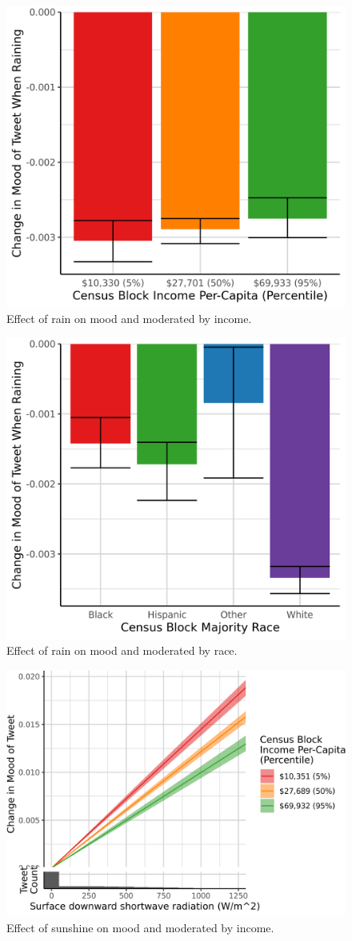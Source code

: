 \documentclass{article}
\begin{document}
\begin{figure}[H]
  \centering
  \includegraphics[width=0.6\linewidth]{../res/raining-income.png}
  \caption{Effect of rain on mood and moderated by income.}
  \label{fig:timeseries}
\end{figure}

\begin{figure}[H]
  \centering
  \includegraphics[width=0.6\linewidth]{../res/raining-race_q.png}
  \caption{Effect of rain on mood and moderated by race.}
  \label{fig:timeseries}
\end{figure}


\begin{figure}[H]
  \centering
  \includegraphics[width=0.6\linewidth]{../res/srad-income.png}
  \caption{Effect of sunshine on mood and moderated by income.}
  \label{fig:timeseries}
\end{figure}
\end{document}
